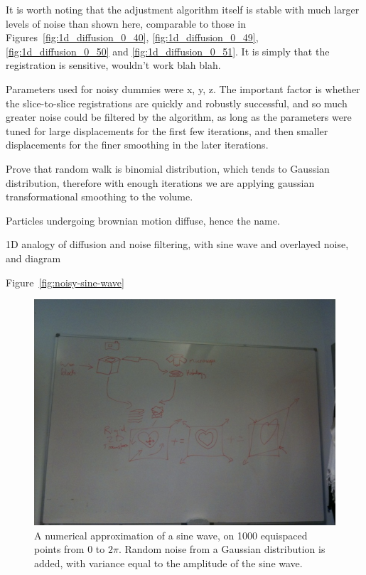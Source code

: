   It is worth noting that the adjustment algorithm itself is stable with much larger levels of noise than shown here, comparable to those in Figures~\ref{fig:1d_diffusion_0_40}, \ref{fig:1d_diffusion_0_49}, \ref{fig:1d_diffusion_0_50} and \ref{fig:1d_diffusion_0_51}. It is simply that the registration is sensitive, wouldn't work blah blah.
  
  Parameters used for noisy dummies were x, y, z. The important factor is whether the slice-to-slice registrations are quickly and robustly successful, and so much greater noise could be filtered by the algorithm, as long as the parameters were tuned for large displacements for the first few iterations, and then smaller displacements for the finer smoothing in the later iterations.
  
  Prove that random walk is binomial distribution, which tends to Gaussian distribution, therefore with enough iterations we are applying gaussian transformational smoothing to the volume.
  
  Particles undergoing brownian motion diffuse, hence the name.
  
  1D analogy of diffusion and noise filtering, with sine wave and overlayed noise, and diagram
    
      Figure~\ref{fig:noisy-sine-wave}
      \begin{figure}[htbp]
        \centering
        \includegraphics[height=0.7\textwidth]{Ch6/Figs/process_diagram}
        \caption{A numerical approximation of a sine wave, on 1000 equispaced points from $0$ to $2\pi$. Random noise from a Gaussian distribution is added, with variance equal to the amplitude of the sine wave.}
      \end{figure}
    
